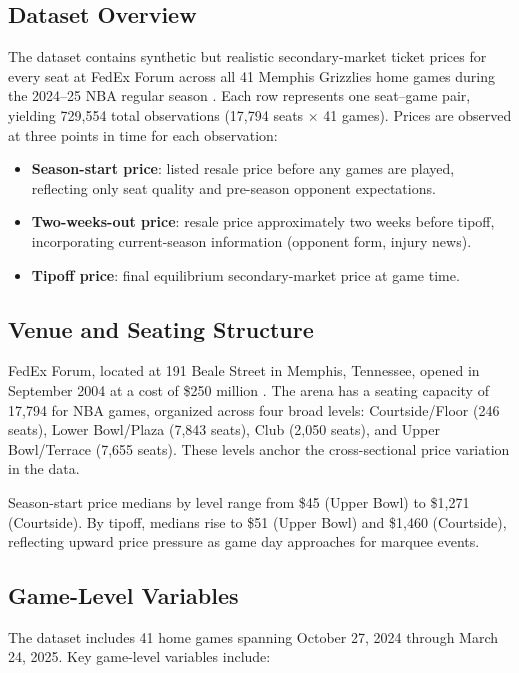 \documentclass[12pt]{article}
\begin{document}
\subsection{Dataset Overview}
 
The dataset contains synthetic but realistic secondary-market ticket prices for every seat at FedEx Forum across all 41 Memphis Grizzlies home games during the 2024--25 NBA regular season \citep{nba2025official}. Each row represents one seat--game pair, yielding 729,554 total observations (17,794 seats $\times$ 41 games). Prices are observed at three points in time for each observation:
 
\begin{itemize}
    \item \textbf{Season-start price}: listed resale price before any games are played, reflecting only seat quality and pre-season opponent expectations.
    \item \textbf{Two-weeks-out price}: resale price approximately two weeks before tipoff, incorporating current-season information (opponent form, injury news).
    \item \textbf{Tipoff price}: final equilibrium secondary-market price at game time.
\end{itemize}
 
\subsection{Venue and Seating Structure}
 
FedEx Forum, located at 191 Beale Street in Memphis, Tennessee, opened in September 2004 at a cost of \$250 million \citep{fedexforum2024about}. The arena has a seating capacity of 17,794 for NBA games, organized across four broad levels: Courtside/Floor (246 seats), Lower Bowl/Plaza (7,843 seats), Club (2,050 seats), and Upper Bowl/Terrace (7,655 seats). These levels anchor the cross-sectional price variation in the data.
 
Season-start price medians by level range from \$45 (Upper Bowl) to \$1,271 (Courtside). By tipoff, medians rise to \$51 (Upper Bowl) and \$1,460 (Courtside), reflecting upward price pressure as game day approaches for marquee events.
 
\subsection{Game-Level Variables}
 
The dataset includes 41 home games spanning October 27, 2024 through March 24, 2025.
Key game-level variables include:
 
\end{document}
